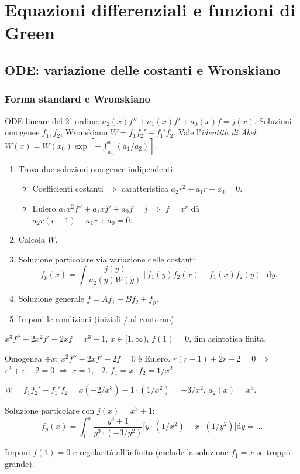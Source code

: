 \documentclass[11pt,a4paper,openany]{book}
\theoremstyle{definition}
\newcommand{\dd}{\mathrm{d}}
\begin{document}
\part{Equazioni differenziali e funzioni di Green}

\chapter{ODE: variazione delle costanti e Wronskiano}

\section{Forma standard e Wronskiano}
ODE lineare del 2$^\circ$ ordine: $a_2(x)f''+a_1(x)f'+a_0(x)f=j(x)$.
Soluzioni omogenee $f_1,f_2$, Wronskiano $W=f_1f_2'-f_1'f_2$. Vale l'\emph{identit\`a di Abel}: $W(x)=W(x_0)\exp[-\int_{x_0}^x(a_1/a_2)]$.

\begin{algoritmo}
\begin{enumerate}
\item Trova due soluzioni omogenee indipendenti:
  \begin{itemize}
  \item Coefficienti costanti $\Rightarrow$ caratteristica $a_2 r^2+a_1 r+a_0=0$.
  \item Eulero $a_2 x^2 f''+a_1 x f'+a_0 f=j$ $\Rightarrow$ $f=x^r$ d\`a $a_2 r(r-1)+a_1 r+a_0=0$.
  \end{itemize}
\item Calcola $W$.
\item Soluzione particolare via variazione delle costanti:
$$f_p(x)=\int\frac{j(y)}{a_2(y)W(y)}[f_1(y)f_2(x)-f_1(x)f_2(y)]\dd y.$$
\item Soluzione generale $f=Af_1+Bf_2+f_p$.
\item Imponi le condizioni (iniziali / al contorno).
\end{enumerate}
\end{algoritmo}

\begin{esempio}[Scritto 10/09/2024, Es. 4]
$x^3 f''+2x^2 f'-2xf=x^3+1$, $x\in[1,\infty)$, $f(1)=0$, lim asintotica finita.

Omogenea $\div x$: $x^2 f''+2xf'-2f=0$ \`e Eulero. $r(r-1)+2r-2=0$ $\Rightarrow$ $r^2+r-2=0$ $\Rightarrow$ $r=1,-2$. $f_1=x$, $f_2=1/x^2$.

$W=f_1 f_2'-f_1'f_2=x(-2/x^3)-1\cdot(1/x^2)=-3/x^2$. $a_2(x)=x^3$.

Soluzione particolare con $j(x)=x^3+1$:
$$f_p(x)=\int_1^x\frac{y^3+1}{y^3\cdot(-3/y^2)}\big[y\cdot(1/x^2)-x\cdot(1/y^2)\big]\dd y=\dots$$

Imponi $f(1)=0$ e regolarit\`a all'infinito (esclude la soluzione $f_1=x$ se troppo grande).
\end{esempio}
\end{document}
